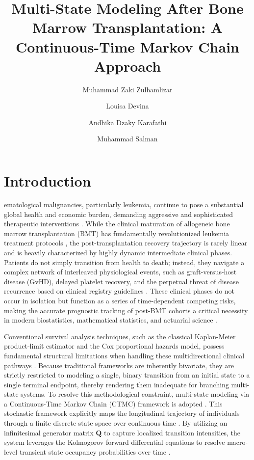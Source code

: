 \documentclass[9pt,a4paper,twocolumn,twoside]{rho-class/rho}
\title{Multi-State Modeling After Bone Marrow Transplantation: A Continuous-Time Markov Chain Approach}
\author[{\textasteriskcentered},a,1]{Muhammad Zaki Zulhamlizar}
\author[{\textdagger},a,2]{Louisa Devina}
\author[{\textdagger},a,3]{Andhika Dzaky Karafathi}
\author[{\textdagger},a,4]{Muhammad Salman}
\affil[a]{Department of Mathematics, Faculty of Mathematics and Natural Sciences, Universitas Indonesia, Depok, Indonesia}
\begin{document}
    \maketitle
    \thispagestyle{firststyle}

\section{Introduction}
    ematological malignancies, particularly leukemia, continue to pose a substantial global health and economic burden, demanding aggressive and sophisticated therapeutic interventions \cite{Sung2021}. While the clinical maturation of allogeneic bone marrow transplantation (BMT) has fundamentally revolutionized leukemia treatment protocols \cite{Thomas1975, Copelan1991}, the post-transplantation recovery trajectory is rarely linear and is heavily characterized by highly dynamic intermediate clinical phases. Patients do not simply transition from health to death; instead, they navigate a complex network of interleaved physiological events, such as graft-versus-host disease (GvHD), delayed platelet recovery, and the perpetual threat of disease recurrence based on clinical registry guidelines \cite{EBMT2024}. These clinical phases do not occur in isolation but function as a series of time-dependent competing risks, making the accurate prognostic tracking of post-BMT cohorts a critical necessity in modern biostatistics, mathematical statistics, and actuarial science \cite{Charpentier2014, BlierWong2024, Putter2007, gsoutinhoebmt4}.

    Conventional survival analysis techniques, such as the classical Kaplan-Meier product-limit estimator and the Cox proportional hazards model, possess fundamental structural limitations when handling these multidirectional clinical pathways \cite{KleinMoeschberger2003}. Because traditional frameworks are inherently bivariate, they are strictly restricted to modeling a single, binary transition from an initial state to a single terminal endpoint, thereby rendering them inadequate for branching multi-state systems. To resolve this methodological constraint, multi-state modeling via a Continuous-Time Markov Chain (CTMC) framework is adopted \cite{AndersenKeiding2002, vanhouwelingen2012dynamic}. This stochastic framework explicitly maps the longitudinal trajectory of individuals through a finite discrete state space over continuous time \cite{Norris1997}. By utilizing an infinitesimal generator matrix $\mathbf{Q}$ to capture localized transition intensities, the system leverages the Kolmogorov forward differential equations to resolve macro-level transient state occupancy probabilities over time \cite{CoxMiller1965, fiocco2008reduced}.
\end{document}
